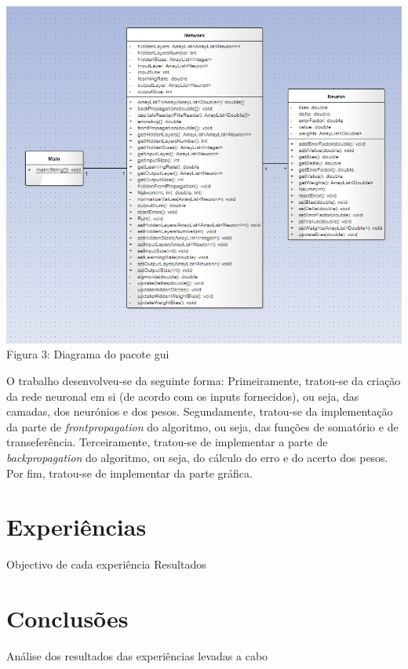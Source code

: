 \documentclass[a4paper]{article}
\begin{document}
\includegraphics[scale=0.5]{neural.png}
\\Figura 3: Diagrama do pacote gui\linebreak\linebreak

O trabalho desenvolveu-se da seguinte forma: \linebreak
Primeiramente, tratou-se da criação da rede neuronal em si (de acordo com os inputs fornecidos), ou seja, das camadas, dos neurónios e dos pesos.\linebreak
Segundamente, tratou-se da implementação da parte de \textit{frontpropagation} do algoritmo, ou seja, das funções de somatório e de transeferência.\linebreak
Terceiramente, tratou-se de implementar a parte de \textit{backpropagation} do algoritmo, ou seja, do cálculo do erro e do acerto dos pesos.\linebreak
Por fim, tratou-se de implementar da parte gráfica.

\section{Experiências}
Objectivo de cada experiência
Resultados



\section{Conclusões}
Análise dos resultados das experiências levadas a cabo
\end{document}
